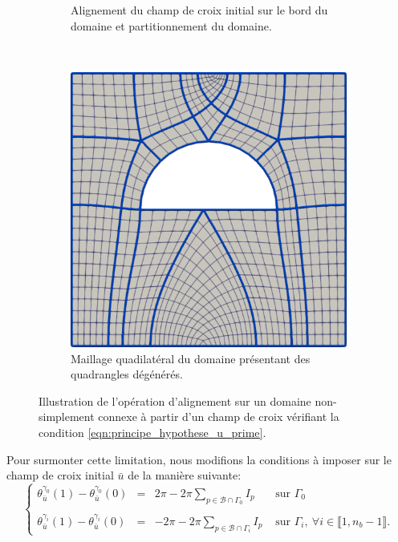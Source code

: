 \begin{figure}[!h]
\begin{subfigure}{0.495\textwidth}
    \caption{Alignement du champ de croix initial sur le bord du domaine et partitionnement du domaine.}
    \label{fig:carre_demi_disc_vide_mauvais_second}
\end{subfigure}
\\[0.2cm]
\begin{subfigure}{0.5\textwidth}
    \includegraphics[width=\textwidth]{images/carre_demi_disc_vide_mauvais_third.pdf}
    \caption{Maillage quadilatéral du domaine présentant des quadrangles dégénérés.}
    \label{fig:carre_demi_disc_vide_mauvais_third}
\end{subfigure}
\caption{Illustration de l'opération d'alignement sur un domaine non-simplement connexe à partir d'un champ de croix vérifiant la condition \eqref{eqn:principe_hypothese_u_prime}.}
\label{fig:carre_demi_disc_vide_mauvais}
\end{figure}
Pour surmonter cette limitation, nous modifions la conditions à imposer sur le champ de croix initial $\bar{u}$ de la manière suivante:
\begin{equation}
    \left\{
    \begin{array}{lcll}
    \theta_{\bar{u}}^{\gamma_0}(1)-\theta_{\bar{u}}^{\gamma_0}(0)&=&2\pi-2\pi\displaystyle\sum_{p\in\mathcal{B}\cap\Gamma_0}I_p&\mbox{ sur }\Gamma_0\\\\
    \theta_{\bar{u}}^{\gamma_i}(1)-\theta_{\bar{u}}^{\gamma_i}(0)&=&-2\pi-2\pi\displaystyle\sum_{p\in\mathcal{B}\cap\Gamma_i}I_p&\mbox{ sur }\Gamma_i,~\forall i\in\llbracket 1, n_b-1\rrbracket.
    \end{array}
    \right.
    \label{eqn:principe_hypothese_u_second}
\end{equation}
